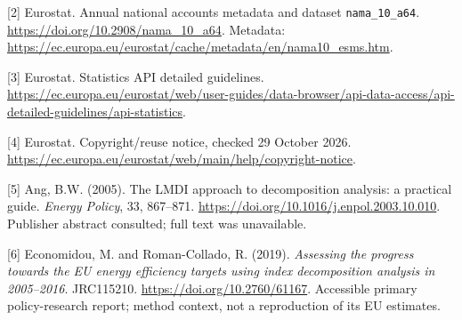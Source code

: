 \documentclass[11pt,letterpaper]{article}
\begin{document}
[2] Eurostat. Annual national accounts metadata and dataset \texttt{nama\_10\_a64}. \url{https://doi.org/10.2908/nama_10_a64}. Metadata: \url{https://ec.europa.eu/eurostat/cache/metadata/en/nama10_esms.htm}.

[3] Eurostat. Statistics API detailed guidelines. \url{https://ec.europa.eu/eurostat/web/user-guides/data-browser/api-data-access/api-detailed-guidelines/api-statistics}.

[4] Eurostat. Copyright/reuse notice, checked 29 October 2026. \url{https://ec.europa.eu/eurostat/web/main/help/copyright-notice}.

[5] Ang, B.W. (2005). The LMDI approach to decomposition analysis: a practical guide. \emph{Energy Policy}, 33, 867--871. \url{https://doi.org/10.1016/j.enpol.2003.10.010}. Publisher abstract consulted; full text was unavailable.

[6] Economidou, M. and Roman-Collado, R. (2019). \emph{Assessing the progress towards the EU energy efficiency targets using index decomposition analysis in 2005--2016}. JRC115210. \url{https://doi.org/10.2760/61167}. Accessible primary policy-research report; method context, not a reproduction of its EU estimates.

\newpage
\normalsize
\end{document}
